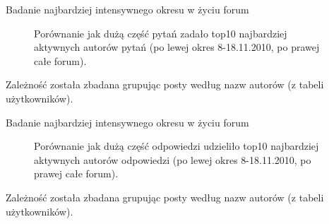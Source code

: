 \documentclass[./main.tex]{subfiles}
\begin{document}
\begin{frame}{Badanie najbardziej intensywnego okresu w życiu forum}
    \begin{figure}[t]
        \centering
        \qquad
        \caption*{Porównanie jak dużą część pytań zadało top10 najbardziej aktywnych autorów pytań (po lewej okres 8-18.11.2010, po prawej całe forum).}
        \label{fig:example}%
    \end{figure}
    \small Zależność została zbadana grupując posty według nazw autorów (z tabeli użytkowników).
\end{frame}

\begin{frame}{Badanie najbardziej intensywnego okresu w życiu forum}
    \begin{figure}[t]
        \centering
        \qquad
        \caption*{Porównanie jak dużą część odpowiedzi udzieliło top10 najbardziej aktywnych autorów odpowiedzi (po lewej okres 8-18.11.2010, po prawej całe forum).}
        \label{fig:example}%
    \end{figure}
    \small Zależność została zbadana grupując posty według nazw autorów (z tabeli użytkowników).
\end{frame}
\end{document}
